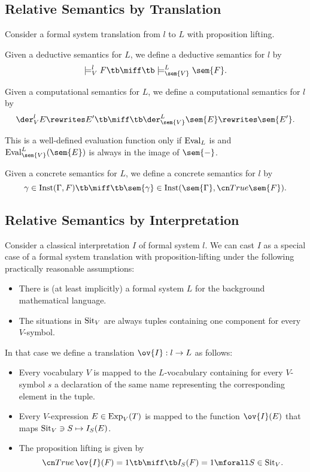\subsection{Relative Semantics by Translation}

Consider a formal system translation from $l$ to $L$ with proposition lifting.

\begin{definition}
Given a deductive semantics for $L$, we define a deductive semantics for $l$ by
\[\models^l_V F \tb\miff\tb \models^L_{\sem{V}}\sem{F}.\]
\end{definition}

\begin{definition}
Given a computational semantics for $L$, we define a computational semantics for $l$ by
\[\der^l_V E\rewrites E' \tb\miff\tb \der^L_\sem{V} \sem{E}\rewrites \sem{E'}.\]

This is a well-defined evaluation function only if $\mathrm{Eval}_L$ is and $\Eval^L_\sem{V}(\sem{E})$ is always in the image of $\sem{-}$.
\end{definition}

\begin{definition}
Given a concrete semantics for $L$, we define a concrete semantics for $l$ by
\[\gamma\in \Inst(\Gamma,F) \tb\miff\tb \sem{\gamma}\in\Inst(\sem{\Gamma},\truelift\sem{F}).\]
\end{definition}

\subsection{Relative Semantics by Interpretation}

Consider a classical interpretation $I$ of formal system $l$.
We can cast $I$ as a special case of a formal system translation with proposition-lifting under the following practically reasonable assumptions:
\begin{itemize}
\item There is (at least implicitly) a formal system $L$ for the background mathematical language.
\item The situations in $\mathrm{Sit}_V$ are always tuples containing one component for every $V$-symbol.
\end{itemize}

In that case we define a translation $\ov{I}:l\to L$ as follows:
\begin{itemize}
\item Every vocabulary $V$ is mapped to the $L$-vocabulary containing for every $V$-symbol $s$ a declaration of the same name representing the corresponding element in the tuple.
\item Every $V$-expression $E\in\mathrm{Exp}_V(T)$ is mapped to the function $\ov{I}(E)$ that maps $\mathrm{Sit}_V\ni S \mapsto I_S(E)$.
\item The proposition lifting is given by \[\truelift\, \ov{I}(F) = 1 \tb\miff \tb I_S(F)=1 \mforall S\in\Sit_V.\]
\end{itemize}

